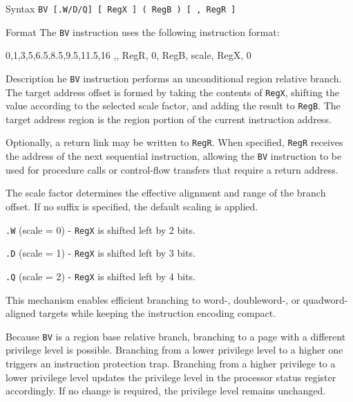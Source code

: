 \pagebreak
{}

\begin{iPageDescEntry}{Syntax}
\texttt{BV [.W/D/Q] [ RegX ] (  RegB ) [ , RegR ]}
\end{iPageDescEntry}

\begin{iPageDescEntry}{Format}
The \texttt{BV} instruction uses the following instruction format: \\

\begin{flushleft}
\drawInstrFormat
    {0,1,3,5,6.5,8.5,9.5,11.5,16}
    {\OpCodeGrpBR,\OpCodeBV, RegR, 0, RegB, scale, RegX, 0}
\end{flushleft}
\end{iPageDescEntry}

\begin{iPageDescEntry}{Description}
he \texttt{BV} instruction performs an unconditional region relative branch. The target address offset is formed by taking the contents of \texttt{RegX}, shifting the value according to the selected scale factor, and adding the result to \texttt{RegB}. The target address region is  the region portion of the current instruction address.

Optionally, a return link may be written to \texttt{RegR}. When specified, \texttt{RegR} receives the address of the next sequential instruction, allowing the \texttt{BV} instruction to be used for procedure calls or control-flow transfers that require a return address.

The scale factor determines the effective alignment and range of the branch offset. If no suffix is specified, the default scaling is applied.

\begin{smallGapItemize}
    \item \texttt{.W} (scale = 0) - \texttt{RegX} is shifted left by 2 bits.
    \item \texttt{.D} (scale = 1) - \texttt{RegX} is shifted left by 3 bits.
    \item \texttt{.Q} (scale = 2) - \texttt{RegX} is shifted left by 4 bits.
\end{smallGapItemize}

This mechanism enables efficient branching to word-, doubleword-, or quadword- aligned targets while keeping the instruction encoding compact.

Because \texttt{BV} is a region base relative branch, branching to a page with a different privilege level is possible. Branching from a lower privilege level to a higher one triggers an instruction protection trap. Branching from a higher privilege to a lower privilege level updates the privilege level in the processor status register accordingly. If no change is required, the privilege level remains unchanged.  
\end{iPageDescEntry}

